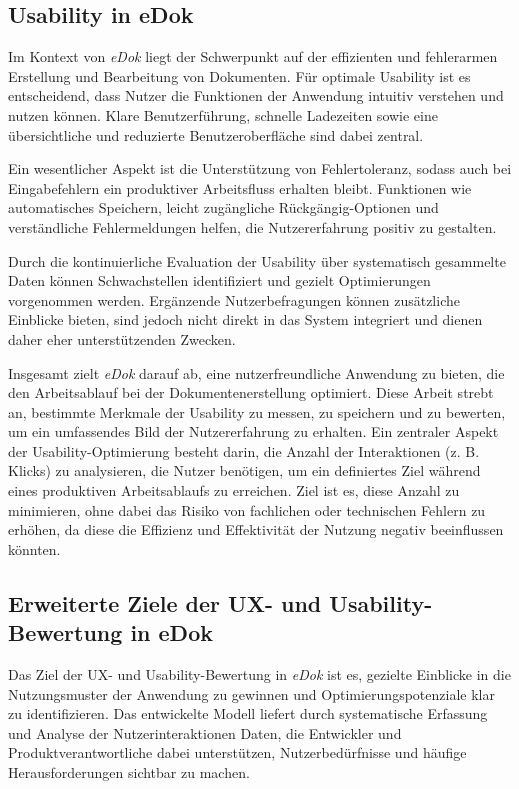 \documentclass[12pt,oneside]{article}
\begin{document}
\subsection{Usability in eDok}

Im Kontext von \textit{eDok} liegt der Schwerpunkt auf der effizienten und fehlerarmen Erstellung und Bearbeitung von Dokumenten. Für optimale Usability ist es entscheidend, dass Nutzer die Funktionen der Anwendung intuitiv verstehen und nutzen können. Klare Benutzerführung, schnelle Ladezeiten sowie eine übersichtliche und reduzierte Benutzeroberfläche sind dabei zentral.

Ein wesentlicher Aspekt ist die Unterstützung von Fehlertoleranz, sodass auch bei Eingabefehlern ein produktiver Arbeitsfluss erhalten bleibt. Funktionen wie automatisches Speichern, leicht zugängliche Rückgängig-Optionen und verständliche Fehlermeldungen helfen, die Nutzererfahrung positiv zu gestalten.

Durch die kontinuierliche Evaluation der Usability über systematisch gesammelte Daten können Schwachstellen identifiziert und gezielt Optimierungen vorgenommen werden. Ergänzende Nutzerbefragungen können zusätzliche Einblicke bieten, sind jedoch nicht direkt in das System integriert und dienen daher eher unterstützenden Zwecken.

Insgesamt zielt \textit{eDok} darauf ab, eine nutzerfreundliche Anwendung zu bieten, die den Arbeitsablauf bei der Dokumentenerstellung optimiert. Diese Arbeit strebt an, bestimmte Merkmale der Usability zu messen, zu speichern und zu bewerten, um ein umfassendes Bild der Nutzererfahrung zu erhalten.
Ein zentraler Aspekt der Usability-Optimierung besteht darin, die Anzahl der Interaktionen (z. B. Klicks) zu analysieren, die Nutzer benötigen, um ein definiertes Ziel während eines produktiven Arbeitsablaufs zu erreichen. Ziel ist es, diese Anzahl zu minimieren, ohne dabei das Risiko von fachlichen oder technischen Fehlern zu erhöhen, da diese die Effizienz und Effektivität der Nutzung negativ beeinflussen könnten.


\subsection{Erweiterte Ziele der UX- und Usability-Bewertung in eDok}

Das Ziel der UX- und Usability-Bewertung in \textit{eDok} ist es, gezielte Einblicke in die Nutzungsmuster der Anwendung zu gewinnen und Optimierungspotenziale klar zu identifizieren. Das entwickelte Modell liefert durch systematische Erfassung und Analyse der Nutzerinteraktionen Daten, die Entwickler und Produktverantwortliche dabei unterstützen, Nutzerbedürfnisse und häufige Herausforderungen sichtbar zu machen.
\end{document}
